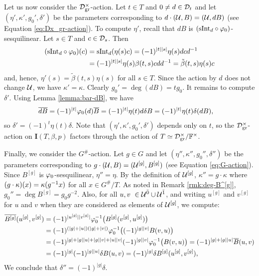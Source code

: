 Let us now consider the $\mathcal{D}^\times_{\mathrm{gr}}$-action.
Let $t\in T$ and $0\neq d \in \mathcal{D}_t$ and let $(\eta', \kappa', g_0', \delta')$ be the parameters corresponding to $d \cdot (\mathcal U, B) = (\mathcal U, d B)$ (see Equation \eqref{eq:Dx_gr-action}).
To compute $\eta'$, recall that $dB$ is $(\mathrm{sInt}_d \circ \varphi_0)$-sesquilinear.
Let $s\in T$ and $c \in \mathcal{D}_s$.
Then
\begin{align*}
	(\mathrm{sInt}_{d} \circ \varphi_0) (c) & = \mathrm{sInt}_{d} ( \eta(s) c ) = (-1)^{|t||s|} \eta(s) d c d^{-1}          \\
	                                      & = (-1)^{|t||s|} \eta(s) \beta(t,s) c d d^{-1} = \tilde{\beta} (t,s) \eta(s) c
\end{align*}
and, hence, $\eta' (s) = \tilde{\beta} (t,s) \eta(s)$ for all $s\in T$.
Since the action by $d$ does not change $\mathcal U$, we have $\kappa' = \kappa$.
Clearly $g_0' = \deg (dB) = t g_0$.
It remains to compute $\delta'$.
Using Lemma \ref{lemma:bar-dB}, we have
\begin{align*}
	\overline{d B} & = (-1)^{|t|} \varphi_0(d) \overline{B} = (-1)^{|t|} \eta(t) d \delta B = (-1)^{|t|} \eta(t) \delta (d B),
\end{align*}
so $\delta' = (-1)^{t} \eta(t) \delta$.
Note that $(\eta', \kappa', g_0', \delta')$ depends only on $t$, so the $\mathcal{D}^\times_\mathrm{gr}$-action on $\mathbf{I}(T, \beta, p)$ factors through the action of $T \simeq \mathcal{D}^\times_\mathrm{gr}/\mathbb{F}^\times$.

Finally, we consider the $G^\#$-action.
Let $g\in G$ and let $(\eta'', \kappa'', g_0'', \delta'')$ be the parameters corresponding to $g \cdot (\mathcal U, B) = (\mathcal U^{[g]}, B^{[g]})$ (see Equation \eqref{eq:G-action}).
Since $B^{[g]}$ is $\varphi_0$-sesquilinear, $\eta'' = \eta$. By the definition of $\mathcal U^{[g]}$, $\kappa'' = g\cdot \kappa$ where $(g\cdot \kappa) (x) = \kappa(g^{-1} x)$ for all $x\in G^\#/T$. 
As noted in Remark \ref{rmk:deg-B^[g]}, $g_0'' = \deg B^{[g]} = g_0 g^{-2}$.
Also, for all $u, v\ \in \mathcal U^{\bar0} \cup \mathcal U^{\bar1}$, and writing $u^{[g]}$ and $v^{[g]}$ for $u$ and $v$ when they are considered as elements of $\mathcal U^{[g]}$, we compute:
\begin{align*}
	\overline{B^{[g]}}(u^{[g]},v^{[g]}) & = (-1)^{|u^{[g]}||v^{[g]}|} \varphi_0^{-1} \big( B^{[g]} (v^{[g]}, u^{[g]}) \big)                                              \\
	                                    & = (-1)^{(|g| + |u|) (|g| + |v|)} \varphi_0^{-1} \big( (-1)^{|g||v|} B(v, u) \big)                                              \\
	                                    & = (-1)^{|g| + |g||u| + |g||v| + |u||v|} (-1)^{|g||v|} \varphi_0^{-1} \big(B(v, u) \big) = (-1)^{|g| + |g||u|} \overline B(u,v) \\
	                                    & = (-1)^{|g|} (-1)^{|g||u|} \delta B(u,v) = (-1)^{|g|} \delta B^{[g]}(u^{[g]},v^{[g]}),
\end{align*}
We conclude that $\delta'' = (-1)^{|g|} \delta$.

